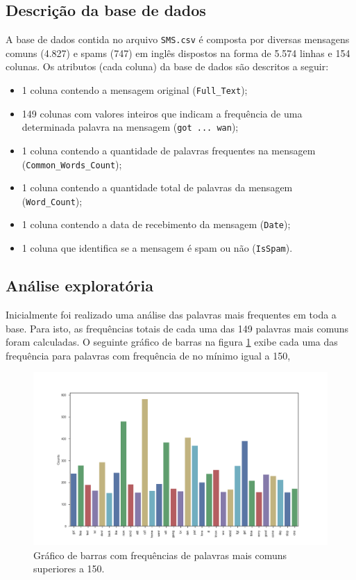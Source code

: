\documentclass[a4paper,11pt]{article}
\begin{document}
\subsection{Descrição da base de dados}

A base de dados contida no arquivo \texttt{SMS.csv} é composta por diversas mensagens comuns (4.827)
e spams (747) em inglês dispostos na forma de 5.574 linhas e 154 colunas. Os atributos (cada coluna) 
da base de dados são descritos a seguir:

\begin{itemize}
 \item 1 coluna contendo a mensagem original (\texttt{Full\_Text});
 \item 149 colunas com valores inteiros que indicam a frequência de uma determinada palavra na 
 mensagem (\texttt{got ... wan});
 \item 1 coluna contendo a quantidade de palavras frequentes na mensagem 
 (\texttt{Common\_Words\_Count});
 \item 1 coluna contendo a quantidade total de palavras da mensagem (\texttt{Word\_Count});
 \item 1 coluna contendo a data de recebimento da mensagem (\texttt{Date});
 \item 1 coluna que identifica se a mensagem é spam ou não (\texttt{IsSpam}).
\end{itemize}


\subsection{Análise exploratória}

Inicialmente foi realizado uma análise das palavras mais frequentes em toda a base. Para isto, 
as frequências totais de cada uma das 149 palavras mais comuns foram calculadas. O seguinte gráfico 
de barras na figura \ref{fig:barplot} exibe cada uma das frequência para palavras com frequência de 
no mínimo igual a 150,

\begin{figure}[htbp]
    \centering
    \includegraphics[width=\textwidth]{word_barplot.png}
    \caption[Figura simples]{Gráfico de barras com frequências de palavras mais comuns superiores 
    a 150.}
    \label{fig:barplot}
\end{figure}
\end{document}
